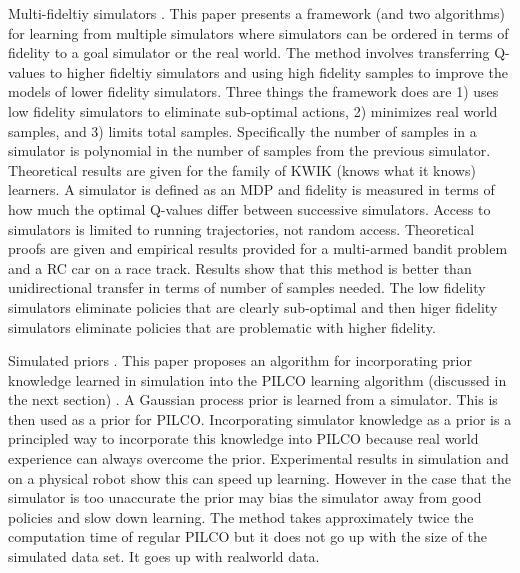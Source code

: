 \documentclass[12 pt]{article}
\begin{document}
Multi-fideltiy simulators \cite{cutler2014reinforcement}.
This paper presents a framework (and two algorithms) for learning from multiple simulators where simulators can be ordered in terms of fidelity to a goal simulator or the real world. The method involves transferring Q-values to higher fideltiy simulators and using high fidelity samples to improve the models of lower fidelity simulators. Three things the framework does are 1) uses low fidelity simulators to eliminate sub-optimal actions, 2) minimizes real world samples, and 3) limits total samples. Specifically the number of samples in a simulator is polynomial in the number of samples from the previous simulator. Theoretical results are given for the family of KWIK (knows what it knows) learners. A simulator is defined as an MDP and fidelity is measured in terms of how much the optimal Q-values differ between successive simulators. Access to simulators is limited to running trajectories, not random access. Theoretical proofs are given and empirical results provided for a multi-armed bandit problem and a RC car on a race track. Results show that this method is better than unidirectional transfer in terms of number of samples needed. The low fidelity simulators eliminate policies that are clearly sub-optimal and then higer fidelity simulators eliminate policies that are problematic with higher fidelity.


Simulated priors \cite{cutler2015efficient}.
This paper proposes an algorithm for incorporating prior knowledge learned in simulation into the PILCO learning algorithm (discussed in the next section) \cite{deisenroth2011pilco}. A Gaussian process prior is learned from a simulator. This is then used as a prior for PILCO. Incorporating simulator knowledge as a prior is a principled way to incorporate this knowledge into PILCO because real world experience can always overcome the prior. Experimental results in simulation and on a physical robot show this can speed up learning. However in the case that the simulator is too unaccurate the prior may bias the simulator away from good policies and slow down learning. The method takes approximately twice the computation time of regular PILCO but it does not go up with the size of the simulated data set. It goes up with realworld data.
\end{document}
